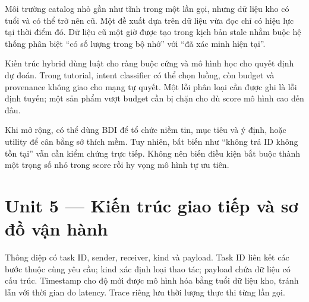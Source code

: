 Môi trường catalog nhỏ gần như tĩnh trong một lần gọi, nhưng dữ liệu kho
có tuổi và có thể trở nên cũ. Một đề xuất dựa trên dữ liệu vừa đọc chỉ
có hiệu lực tại thời điểm đó. Dữ liệu cũ một giờ được tạo trong kịch bản
stale nhằm buộc hệ thống phân biệt ``có số lượng trong bộ nhớ'' với ``đã
xác minh hiện tại''.

Kiến trúc hybrid dùng luật cho ràng buộc cứng và mô hình học cho quyết
định dự đoán. Trong tutorial, intent classifier có thể chọn luồng, còn
budget và provenance không giao cho mạng tự quyết. Một lỗi phân loại cần
được ghi là lỗi định tuyến; một sản phẩm vượt budget cần bị chặn cho dù
score mô hình cao đến đâu.

Khi mở rộng, có thể dùng BDI để tổ chức niềm tin, mục tiêu và ý định,
hoặc utility để cân bằng sở thích mềm. Tuy nhiên, bất biến như ``không
trả ID không tồn tại'' vẫn cần kiểm chứng trực tiếp. Không nên biến điều
kiện bắt buộc thành một trọng số nhỏ trong score rồi hy vọng mô hình tự
ưu tiên.

\section{Unit 5 --- Kiến trúc giao tiếp và sơ đồ vận
hành}\label{unit-5-kiux1ebfn-truxfac-giao-tiux1ebfp-vuxe0-sux1a1-ux111ux1ed3-vux1eadn-huxe0nh}

\begin{center}
\end{center}

Thông điệp có task ID, sender, receiver, kind và payload. Task ID liên
kết các bước thuộc cùng yêu cầu; kind xác định loại thao tác; payload
chứa dữ liệu có cấu trúc. Timestamp cho độ mới được mô hình hóa bằng
tuổi dữ liệu kho, tránh lẫn với thời gian đo latency. Trace riêng lưu
thời lượng thực thi từng lần gọi.


